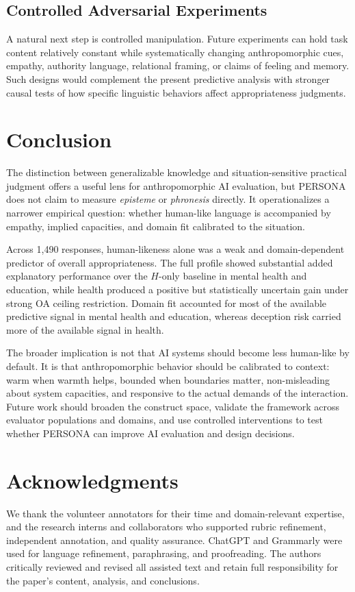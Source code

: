 \documentclass[manuscript,review,anonymous]{acmart}
\begin{document}
\subsection{Controlled Adversarial Experiments}

A natural next step is controlled manipulation. Future experiments can hold task content relatively constant while systematically changing anthropomorphic cues, empathy, authority language, relational framing, or claims of feeling and memory. Such designs would complement the present predictive analysis with stronger causal tests of how specific linguistic behaviors affect appropriateness judgments.

\section{Conclusion}

The distinction between generalizable knowledge and situation-sensitive practical judgment offers a useful lens for anthropomorphic AI evaluation, but PERSONA does not claim to measure \textit{episteme} or \textit{phronesis} directly. It operationalizes a narrower empirical question: whether human-like language is accompanied by empathy, implied capacities, and domain fit calibrated to the situation.

Across 1,490 responses, human-likeness alone was a weak and domain-dependent predictor of overall appropriateness. The full profile showed substantial added explanatory performance over the $H$-only baseline in mental health and education, while health produced a positive but statistically uncertain gain under strong OA ceiling restriction. Domain fit accounted for most of the available predictive signal in mental health and education, whereas deception risk carried more of the available signal in health.

The broader implication is not that AI systems should become less human-like by default. It is that anthropomorphic behavior should be calibrated to context: warm when warmth helps, bounded when boundaries matter, non-misleading about system capacities, and responsive to the actual demands of the interaction. Future work should broaden the construct space, validate the framework across evaluator populations and domains, and use controlled interventions to test whether PERSONA can improve AI evaluation and design decisions.


\section*{Acknowledgments}

We thank the volunteer annotators for their time and domain-relevant expertise, and the research interns and collaborators who supported rubric refinement, independent annotation, and quality assurance. ChatGPT and Grammarly were used for language refinement, paraphrasing, and proofreading. The authors critically reviewed and revised all assisted text and retain full responsibility for the paper's content, analysis, and conclusions.



\end{document}
